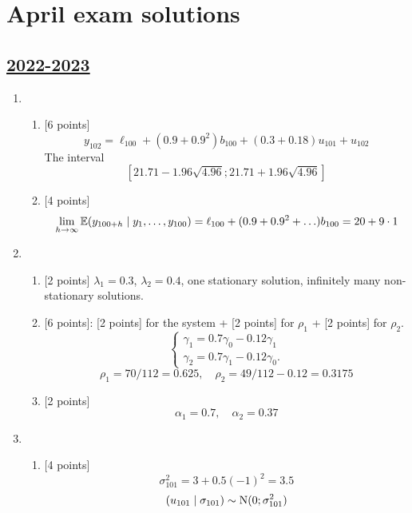
\newpage
\thispagestyle{empty}
\section{April exam solutions}
 

\subsection[2022-2023]{\hyperref[sec:kr_03_2022_2023]{2022-2023}}
\label{sec:sol_kr_03_2023_2023} %

\begin{enumerate}
    \item 
\begin{enumerate}
    \item {[6 points]}
    \[
        y_{102}= \ell_{100} + (0.9 + 0.9^2) b_{100} + (0.3 + 0.18)u_{101} + u_{102}    
        \]
        The interval
        \[
        [21.71 - 1.96 \sqrt{4.96};21.71 + 1.96 \sqrt{4.96}]    
        \]
    \item {[4 points]}
    \[
    \lim_{h\to\infty} \operatorname{\mathbb{E}}(y_{100+h} \mid y_1, \ldots, y_{100}) = \ell_{100} + (0.9 + 0.9^2 +\ldots) b_{100} = 20 + 9\cdot 1    
    \]    
\end{enumerate}
\item 
\begin{enumerate}
    \item {[2 points]} $\lambda_1 = 0.3$, $\lambda_2 = 0.4$, one stationary solution, infinitely many non-stationary solutions. 
    \item {[6 points]}: {[2 points] for the system} + {[2 points] for $\rho_1$} + {[2 points] for $\rho_2$}.
    \[
        \begin{cases}
            \gamma_1 = 0.7 \gamma_0  - 0.12 \gamma_1 \\
            \gamma_2 = 0.7 \gamma_1 - 0.12 \gamma_0. 
        \end{cases}
    \]
    \[
    \rho_1 = 70/112 = 0.625, \quad \rho_2 = 49/112 - 0.12 = 0.3175    
    \]
    \item {[2 points]}
    \[
    \alpha_1 = 0.7, \quad \alpha_2 = 0.37    
    \]
\end{enumerate}
\item 
\begin{enumerate}
    \item {[4 points]}
    \[
    \sigma^2_{101} = 3 + 0.5 (-1)^2= 3.5    
    \]
    \[
    (u_{101}\mid \sigma_{101}) \sim \mathrm{N}(0; \sigma^2_{101})    
\]
\end{enumerate}
\end{enumerate}
